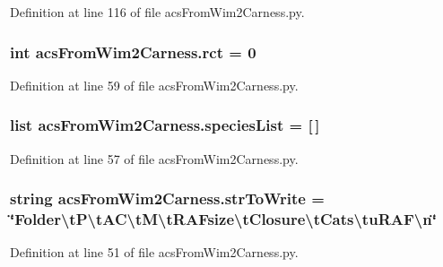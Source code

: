 Definition at line 116 of file acs\-From\-Wim2\-Carness.\-py.

\hypertarget{a00094_a61159eb5aec77b97808ce3fb742d8f6d}{
\subsubsection[{rct}]{\setlength{\rightskip}{0pt plus 5cm}int acs\-From\-Wim2\-Carness.\-rct = 0}}\label{a00094_a61159eb5aec77b97808ce3fb742d8f6d}


Definition at line 59 of file acs\-From\-Wim2\-Carness.\-py.

\hypertarget{a00094_aff8baae5d4cd1678204477dd5e620775}{
\subsubsection[{species\-List}]{\setlength{\rightskip}{0pt plus 5cm}list acs\-From\-Wim2\-Carness.\-species\-List = \mbox{[}$\,$\mbox{]}}}\label{a00094_aff8baae5d4cd1678204477dd5e620775}


Definition at line 57 of file acs\-From\-Wim2\-Carness.\-py.

\hypertarget{a00094_a34b3667c3c217a35a0e9b71458d2b233}{
\subsubsection[{str\-To\-Write}]{\setlength{\rightskip}{0pt plus 5cm}string acs\-From\-Wim2\-Carness.\-str\-To\-Write = \char`\"{}Folder\textbackslash{}t\-P\textbackslash{}t\-A\-C\textbackslash{}t\-M\textbackslash{}t\-R\-A\-Fsize\textbackslash{}t\-Closure\textbackslash{}t\-Cats\textbackslash{}tu\-R\-A\-F\textbackslash{}n\char`\"{}}}\label{a00094_a34b3667c3c217a35a0e9b71458d2b233}


Definition at line 51 of file acs\-From\-Wim2\-Carness.\-py.

